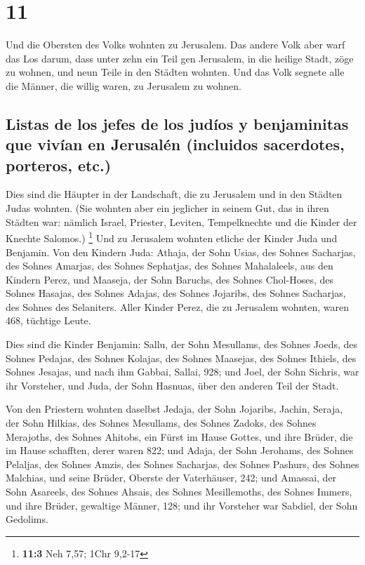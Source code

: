 \hypertarget{section-10}{%
\section{11}\label{section-10}}

 Und die Obersten des Volks wohnten zu Jerusalem. Das
andere Volk aber warf das Los darum, dass unter zehn ein Teil gen
Jerusalem, in die heilige Stadt, zöge zu wohnen, und neun Teile in den
Städten wohnten.  Und das Volk segnete alle die Männer,
die willig waren, zu Jerusalem zu wohnen.

\hypertarget{listas-de-los-jefes-de-los-juduxedos-y-benjaminitas-que-vivuxedan-en-jerusaluxe9n-incluidos-sacerdotes-porteros-etc.}{%
\subsection{Listas de los jefes de los judíos y benjaminitas que vivían
en Jerusalén (incluidos sacerdotes, porteros,
etc.)}\label{listas-de-los-jefes-de-los-juduxedos-y-benjaminitas-que-vivuxedan-en-jerusaluxe9n-incluidos-sacerdotes-porteros-etc.}}

 Dies sind die Häupter in der Landschaft, die zu Jerusalem
und in den Städten Judas wohnten. (Sie wohnten aber ein jeglicher in
seinem Gut, das in ihren Städten war: nämlich Israel, Priester, Leviten,
Tempelknechte und die Kinder der Knechte Salomos.) \footnote{\textbf{11:3}
  Neh 7,57; 1Chr 9,2-17}  Und zu Jerusalem wohnten etliche
der Kinder Juda und Benjamin. Von den Kindern Juda: Athaja, der Sohn
Usias, des Sohnes Sacharjas, des Sohnes Amarjas, des Sohnes Sephatjas,
des Sohnes Mahalaleels, aus den Kindern Perez,  und
Maaseja, der Sohn Baruchs, des Sohnes Chol-Hoses, des Sohnes Hasajas,
des Sohnes Adajas, des Sohnes Jojaribs, des Sohnes Sacharjas, des Sohnes
des Selaniters.  Aller Kinder Perez, die zu Jerusalem
wohnten, waren 468, tüchtige Leute.

 Dies sind die Kinder Benjamin: Sallu, der Sohn Mesullams,
des Sohnes Joeds, des Sohnes Pedajas, des Sohnes Kolajas, des Sohnes
Maasejas, des Sohnes Ithiels, des Sohnes Jesajas,  und
nach ihm Gabbai, Sallai, 928;  und Joel, der Sohn Sichris,
war ihr Vorsteher, und Juda, der Sohn Hasnuas, über den anderen Teil der
Stadt.

 Von den Priestern wohnten daselbst Jedaja, der Sohn
Jojaribs, Jachin,  Seraja, der Sohn Hilkias, des Sohnes
Mesullams, des Sohnes Zadoks, des Sohnes Merajoths, des Sohnes Ahitobs,
ein Fürst im Hause Gottes,  und ihre Brüder, die im Hause
schafften, derer waren 822; und Adaja, der Sohn Jerohams, des Sohnes
Pelaljas, des Sohnes Amzis, des Sohnes Sacharjas, des Sohnes Pashurs,
des Sohnes Malchias,  und seine Brüder, Oberste der
Vaterhäuser, 242; und Amassai, der Sohn Asareels, des Sohnes Ahsais, des
Sohnes Mesillemoths, des Sohnes Immers,  und ihre Brüder,
gewaltige Männer, 128; und ihr Vorsteher war Sabdiel, der Sohn Gedolims.

